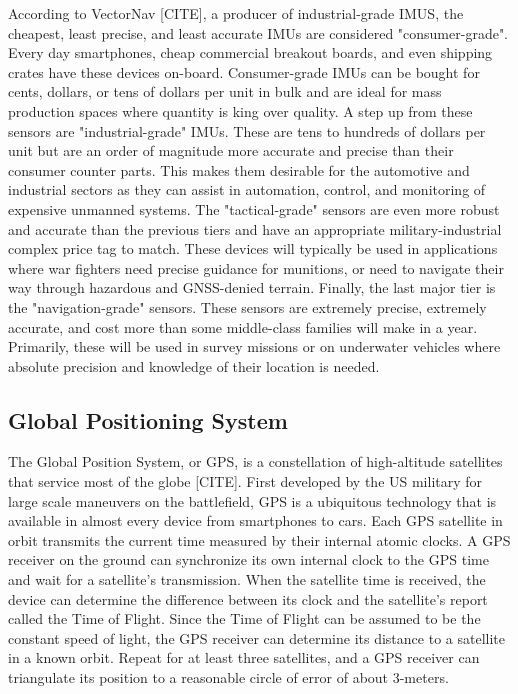 According to VectorNav [CITE], a producer of industrial-grade IMUS, the cheapest, least precise, and least accurate IMUs are considered "consumer-grade".
Every day smartphones, cheap commercial breakout boards, and even shipping crates have these devices on-board.
Consumer-grade IMUs can be bought for cents, dollars, or tens of dollars per unit in bulk and are ideal for mass production spaces where quantity is king over quality.
A step up from these sensors are "industrial-grade" IMUs. 
These are tens to hundreds of dollars per unit but are an order of magnitude more accurate and precise than their consumer counter parts.
This makes them desirable for the automotive and industrial sectors as they can assist in automation, control, and monitoring of expensive unmanned systems.
The "tactical-grade" sensors are even more robust and accurate than the previous tiers and have an appropriate military-industrial complex price tag to match. 
These devices will typically be used in applications where war fighters need precise guidance for munitions, or need to navigate their way through hazardous and GNSS-denied terrain.
Finally, the last major tier is the "navigation-grade" sensors. 
These sensors are extremely precise, extremely accurate, and cost more than some middle-class families will make in a year.
Primarily, these will be used in survey missions or on underwater vehicles where absolute precision and knowledge of their location is needed.

\subsection{Global Positioning System} \label{ssec:bkg_gps}
The Global Position System, or GPS, is a constellation of high-altitude satellites that service most of the globe [CITE].
First developed by the US military for large scale maneuvers on the battlefield, GPS is a ubiquitous technology that is available in almost every device from smartphones to cars.
Each GPS satellite in orbit transmits the current time measured by their internal atomic clocks.
A GPS receiver on the ground can synchronize its own internal clock to the GPS time and wait for a satellite's transmission.
When the satellite time is received, the device can determine the difference between its clock and the satellite's report called the Time of Flight.
Since the Time of Flight can be assumed to be the constant speed of light, the GPS receiver can determine its distance to a satellite in a known orbit.
Repeat for at least three satellites, and a GPS receiver can triangulate its position to a reasonable circle of error of about 3-meters.

